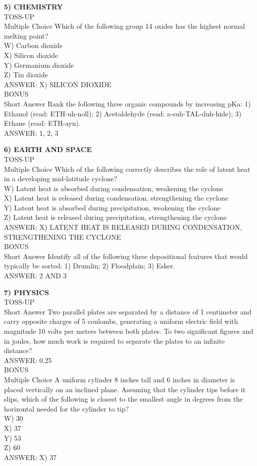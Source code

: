 \documentclass{article}
\begin{document}
\noindent \textbf{5) CHEMISTRY} \\
TOSS-UP \\
Multiple Choice Which of the following group 14 oxides has the highest normal melting point? \\
W) Carbon dioxide \\
X) Silicon dioxide \\
Y) Germanium dioxide \\
Z) Tin dioxide \\
ANSWER: X) SILICON DIOXIDE \\
BONUS \\
Short Answer Rank the following three organic compounds by increasing pKa: 1) Ethanol (read: ETH-uh-noll); 2) Acetaldehyde (read: a-suh-TAL-duh-hide); 3) Ethane (read: ETH-ayn). \\
ANSWER: 1, 2, 3

\noindent \textbf{6) EARTH AND SPACE} \\
TOSS-UP \\
Multiple Choice Which of the following correctly describes the role of latent heat in a developing mid-latitude cyclone? \\
W) Latent heat is absorbed during condensation, weakening the cyclone \\
X) Latent heat is released during condensation, strengthening the cyclone \\
Y) Latent heat is absorbed during precipitation, weakening the cyclone \\
Z) Latent heat is released during precipitation, strengthening the cyclone \\
ANSWER: X) LATENT HEAT IS RELEASED DURING CONDENSATION, STRENGTHENING THE CYCLONE \\
BONUS \\
Short Answer Identify all of the following three depositional features that would typically be sorted: 1) Drumlin; 2) Floodplain; 3) Esker. \\
ANSWER: 2 AND 3

\noindent \textbf{7) PHYSICS} \\
TOSS-UP \\
Short Answer Two parallel plates are separated by a distance of 1 centimeter and carry opposite charges of 5 coulombs, generating a uniform electric field with magnitude 10 volts per meters between both plates. To two significant figures and in joules, how much work is required to separate the plates to an infinite distance? \\
ANSWER: 0.25 \\
BONUS \\
Multiple Choice A uniform cylinder 8 inches tall and 6 inches in diameter is placed vertically on an inclined plane. Assuming that the cylinder tips before it slips, which of the following is closest to the smallest angle in degrees from the horizontal needed for the cylinder to tip? \\
W) 30 \\
X) 37 \\
Y) 53 \\
Z) 60 \\
ANSWER: X) 37
\end{document}
